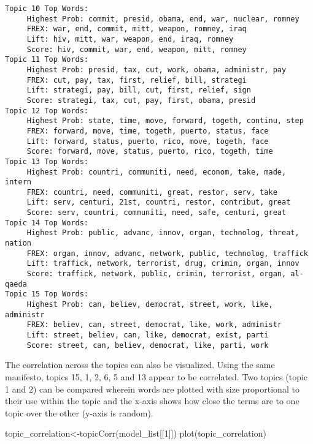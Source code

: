\documentclass[
]{article}
\newenvironment{Shaded}{\begin{snugshade}}{\end{snugshade}}
\newcommand{\DecValTok}[1]{\textcolor[rgb]{0.00,0.00,0.81}{#1}}
\newcommand{\FunctionTok}[1]{\textcolor[rgb]{0.00,0.00,0.00}{#1}}
\newcommand{\NormalTok}[1]{#1}
\newcommand{\OtherTok}[1]{\textcolor[rgb]{0.56,0.35,0.01}{#1}}
\begin{document}
\begin{verbatim}
Topic 10 Top Words:
     Highest Prob: commit, presid, obama, end, war, nuclear, romney 
     FREX: war, end, commit, mitt, weapon, romney, iraq 
     Lift: hiv, mitt, war, weapon, end, iraq, romney 
     Score: hiv, commit, war, end, weapon, mitt, romney 
Topic 11 Top Words:
     Highest Prob: presid, tax, cut, work, obama, administr, pay 
     FREX: cut, pay, tax, first, relief, bill, strategi 
     Lift: strategi, pay, bill, cut, first, relief, sign 
     Score: strategi, tax, cut, pay, first, obama, presid 
Topic 12 Top Words:
     Highest Prob: state, time, move, forward, togeth, continu, step 
     FREX: forward, move, time, togeth, puerto, status, face 
     Lift: forward, status, puerto, rico, move, togeth, face 
     Score: forward, move, status, puerto, rico, togeth, time 
Topic 13 Top Words:
     Highest Prob: countri, communiti, need, econom, take, made, intern 
     FREX: countri, need, communiti, great, restor, serv, take 
     Lift: serv, centuri, 21st, countri, restor, contribut, great 
     Score: serv, countri, communiti, need, safe, centuri, great 
Topic 14 Top Words:
     Highest Prob: public, advanc, innov, organ, technolog, threat, nation 
     FREX: organ, innov, advanc, network, public, technolog, traffick 
     Lift: traffick, network, terrorist, drug, crimin, organ, innov 
     Score: traffick, network, public, crimin, terrorist, organ, al-qaeda 
Topic 15 Top Words:
     Highest Prob: can, believ, democrat, street, work, like, administr 
     FREX: believ, can, street, democrat, like, work, administr 
     Lift: street, believ, can, like, democrat, exist, parti 
     Score: street, can, believ, democrat, like, parti, work 
\end{verbatim}

The correlation across the topics can also be visualized. Using the same
manifesto, topics 15, 1, 2, 6, 5 and 13 appear to be correlated. Two
topics (topic 1 and 2) can be compared wherein words are plotted with
size proportional to their use within the topic and the x-axis shows how
close the terms are to one topic over the other (y-axis is random).

\begin{Shaded}
\begin{Highlighting}[]
\NormalTok{topic\_correlation}\OtherTok{\textless{}{-}}\FunctionTok{topicCorr}\NormalTok{(model\_list[[}\DecValTok{1}\NormalTok{]])}
\FunctionTok{plot}\NormalTok{(topic\_correlation)}
\end{Highlighting}
\end{Shaded}
\end{document}
